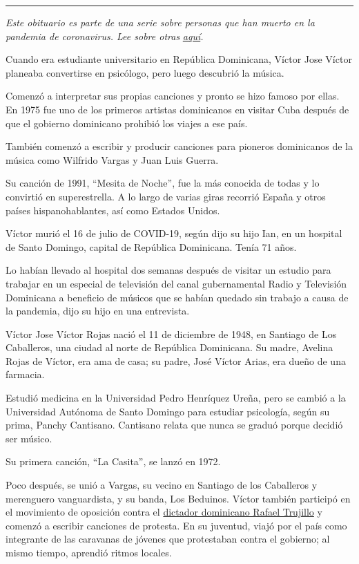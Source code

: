 \begin{center}\rule{0.5\linewidth}{\linethickness}\end{center}

\emph{Este obituario es parte de una serie sobre personas que han muerto
en la pandemia de coronavirus. Lee sobre otras}
\href{https://www.nytimes3xbfgragh.onion/interactive/2020/obituaries/people-died-coronavirus-obituaries.html}{\emph{aquí}}\emph{.}

Cuando era estudiante universitario en República Dominicana, Víctor Jose
Víctor planeaba convertirse en psicólogo, pero luego descubrió la
música.

Comenzó a interpretar sus propias canciones y pronto se hizo famoso por
ellas. En 1975 fue uno de los primeros artistas dominicanos en visitar
Cuba después de que el gobierno dominicano prohibió los viajes a ese
país.

También comenzó a escribir y producir canciones para pioneros
dominicanos de la música como Wilfrido Vargas y Juan Luis Guerra.

Su canción de 1991, ``Mesita de Noche'', fue la más conocida de todas y
lo convirtió en superestrella. A lo largo de varias giras recorrió
España y otros países hispanohablantes, así como Estados Unidos.

Víctor murió el 16 de julio de COVID-19, según dijo su hijo Ian, en un
hospital de Santo Domingo, capital de República Dominicana. Tenía 71
años.

Lo habían llevado al hospital dos semanas después de visitar un estudio
para trabajar en un especial de televisión del canal gubernamental Radio
y Televisión Dominicana a beneficio de músicos que se habían quedado sin
trabajo a causa de la pandemia, dijo su hijo en una entrevista.

Víctor Jose Víctor Rojas nació el 11 de diciembre de 1948, en Santiago
de Los Caballeros, una ciudad al norte de República Dominicana. Su
madre, Avelina Rojas de Víctor, era ama de casa; su padre, José Víctor
Arias, era dueño de una farmacia.

Estudió medicina en la Universidad Pedro Henríquez Ureña, pero se cambió
a la Universidad Autónoma de Santo Domingo para estudiar psicología,
según su prima, Panchy Cantisano. Cantisano relata que nunca se graduó
porque decidió ser músico.

Su primera canción, ``La Casita'', se lanzó en 1972.

Poco después, se unió a Vargas, su vecino en Santiago de los Caballeros
y merenguero vanguardista, y su banda, Los Beduinos. Víctor también
participó en el movimiento de oposición contra el
\href{https://www.nytimes3xbfgragh.onion/1959/07/06/archives/dominican-dictator-rafael-leonidas-trujillo-molina.html}{dictador
dominicano Rafael Trujillo} y comenzó a escribir canciones de protesta.
En su juventud, viajó por el país como integrante de las caravanas de
jóvenes que protestaban contra el gobierno; al mismo tiempo, aprendió
ritmos locales.

